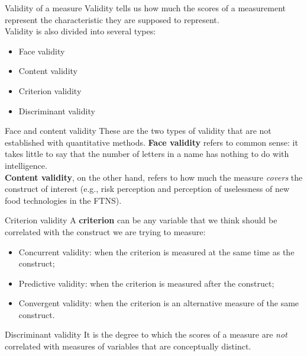 \documentclass{beamer}
\begin{document}
\begin{frame}{Validity of a measure}
    Validity tells us how much the scores of a measurement represent the characteristic they are supposed to represent. \\
    \vspace{1em}
    Validity is also divided into several types:
    \begin{itemize}
        \item Face validity
        \item Content validity
        \item Criterion validity
        \item Discriminant validity
    \end{itemize}
\end{frame}

\begin{frame}{Face and content validity}
    These are the two types of validity that are not established with quantitative methods. \textbf{Face validity} refers to common sense: it takes little to say that the number of letters in a name has nothing to do with intelligence. \\
    \vspace{1em}
    \textbf{Content validity}, on the other hand, refers to how much the measure \textit{covers} the construct of interest (e.g., risk perception and perception of uselessness of new food technologies in the FTNS).
\end{frame}

\begin{frame}{Criterion validity}
    A \textbf{criterion} can be any variable that we think should be correlated with the construct we are trying to measure: \\
    \begin{itemize}
        \item Concurrent validity: when the criterion is measured at the same time as the construct;
        \item Predictive validity: when the criterion is measured after the construct;
        \item Convergent validity: when the criterion is an alternative measure of the same construct.
    \end{itemize}
\end{frame}

\begin{frame}{Discriminant validity}
    It is the degree to which the scores of a measure are \textit{not} correlated with measures of variables that are conceptually distinct.
\end{frame}
\end{document}
